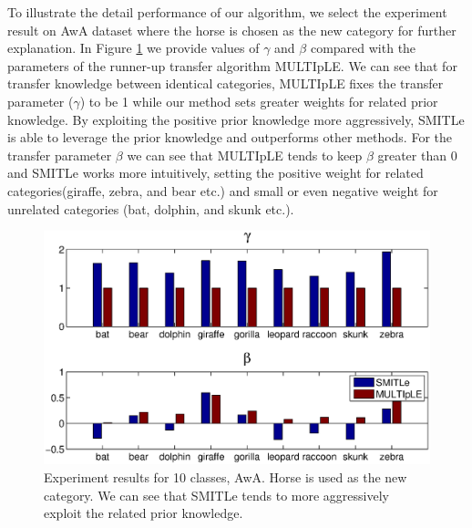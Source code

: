 To illustrate the detail performance of our algorithm, we select the experiment result on AwA dataset where the horse is chosen as the new category for further explanation. %
In Figure \ref{fig:awa} we provide values of $\gamma$ and $\beta$ compared with the parameters of the runner-up transfer algorithm MULTIpLE. We can see that for transfer knowledge between identical categories, MULTIpLE fixes the transfer parameter ($\gamma$) to be 1 while our method sets greater weights for related prior knowledge. By exploiting the positive prior knowledge more aggressively, SMITLe is able to leverage the prior knowledge and outperforms other methods. For the transfer parameter $\beta$ we can see that MULTIpLE tends to keep $\beta$ greater than 0 and SMITLe works more intuitively, setting the positive weight for related categories(giraffe, zebra, and bear etc.) and small or even negative weight for unrelated categories (bat, dolphin, and skunk etc.).


\begin{figure}
\centering
\includegraphics[scale=0.25]{fig/A2A_gama.eps} %
\caption{Experiment results for 10 classes, AwA. Horse is used as the new category. We can see that SMITLe tends to more aggressively exploit the related prior knowledge.}
\label{fig:awa}
\end{figure}


